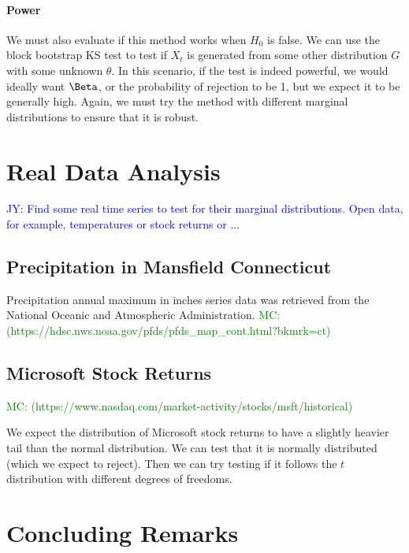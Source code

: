 \documentclass[12pt, letterpaper]{article}
\newcommand{\jy}[1]{\textcolor{blue}{JY: #1}}
\newcommand{\mc}[1]{\textcolor{green}{MC: (#1)}}
\begin{document}
\paragraph{Power}
We must also evaluate if this method works when $H_0$ is false. We can use
the block bootstrap KS test to test if $X_t$ is generated from some other 
distribution $G$ with some unknown $\theta$. In this scenario, if the test is 
indeed powerful,
we would ideally want $\Beta$, or the probability of rejection to be 1, but we
expect it to be generally high. Again, we must try the method with different
marginal distributions to ensure that it is robust.


\section{Real Data Analysis}

\jy{Find some real time series to test for their marginal distributions. Open
  data, for example, temperatures or stock returns or ...}

\subsection{Precipitation in Mansfield Connecticut}
Precipitation annual maximum in inches series data was retrieved from the 
National Oceanic and Atmospheric Administration.
\mc{https://hdsc.nws.noaa.gov/pfds/pfds_map_cont.html?bkmrk=ct}

\subsection{Microsoft Stock Returns}

\mc{https://www.nasdaq.com/market-activity/stocks/msft/historical}

We expect the distribution of Microsoft stock returns to have a slightly
heavier tail than the normal distribution. We can test that it is normally
distributed (which we expect to reject). Then we can try testing if it follows
the $t$ distribution with different degrees of freedoms.


\section{Concluding Remarks}
\label{sec:conclusion}







\end{document}
